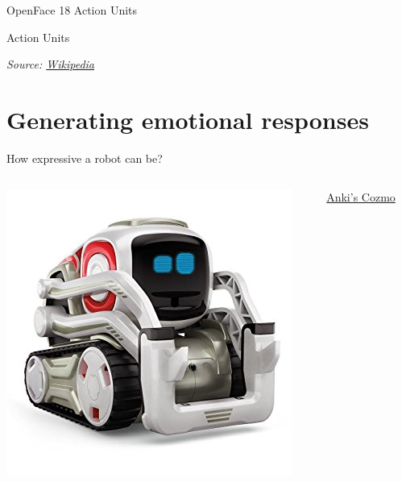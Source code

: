 \documentclass[compress]{beamer}
\newcommand{\source}[2]{{\tiny\it Source: \href{#1}{#2}}}
\begin{document}
\begin{frame}{OpenFace 18 Action Units}
\end{frame}

\begin{frame}{Action Units}



\source{https://en.wikipedia.org/wiki/Facial_Action_Coding_System}{Wikipedia}
\end{frame}

\section{Generating emotional responses}


\begin{frame}{How expressive a robot can be?}

    \begin{columns}
        \begin{column}{0.5\linewidth}
            \begin{center}
                \includegraphics[width=0.8\linewidth]{cozmo}
            \end{center}
        \end{column}
        \begin{column}{0.5\linewidth}
            \href{https://www.anki.com/en-gb/cozmo}{Anki's Cozmo}
        \end{column}
    \end{columns}
\end{frame}

\end{document}
